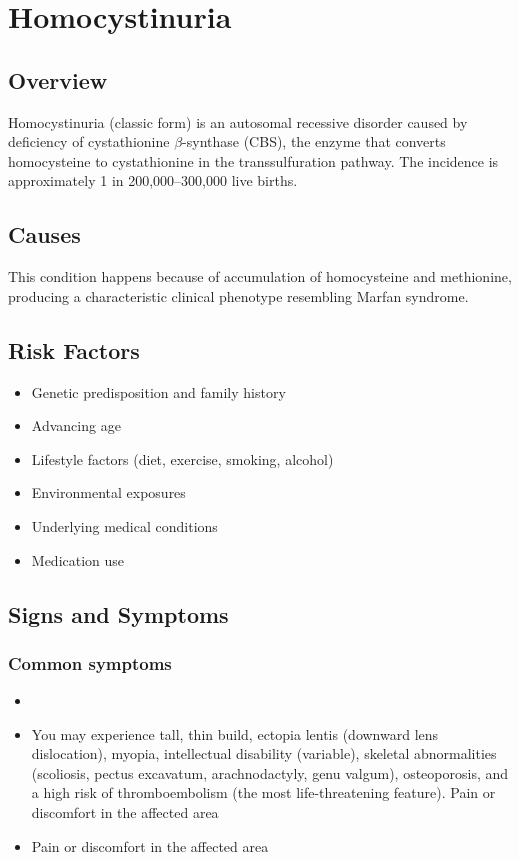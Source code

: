 \chapter{Homocystinuria}
\label{sec:Homocystinuria}

\section{Overview}
Homocystinuria (classic form) is an autosomal recessive disorder caused by deficiency of cystathionine $\beta$-synthase (CBS), the enzyme that converts homocysteine to cystathionine in the transsulfuration pathway. The incidence is approximately 1 in 200,000--300,000 live births.
\section{Causes}
This condition happens because of accumulation of homocysteine and methionine, producing a characteristic clinical phenotype resembling Marfan syndrome.     
\section{Risk Factors}

\begin{itemize}[noitemsep]
  \item Genetic predisposition and family history
  \item Advancing age
  \item Lifestyle factors (diet, exercise, smoking, alcohol)
  \item Environmental exposures
  \item Underlying medical conditions
  \item Medication use
\end{itemize}
\section{Signs and Symptoms}

\subsection{Common symptoms}
\begin{itemize}[noitemsep]
  \item \item You may experience tall, thin build, ectopia lentis (downward lens dislocation), myopia, intellectual disability (variable), skeletal abnormalities (scoliosis, pectus excavatum, arachnodactyly, genu valgum), osteoporosis, and a high risk of thromboembolism (the most life-threatening feature). Pain or discomfort in the affected area    \item Pain or discomfort in the affected area
  \end{itemize}

